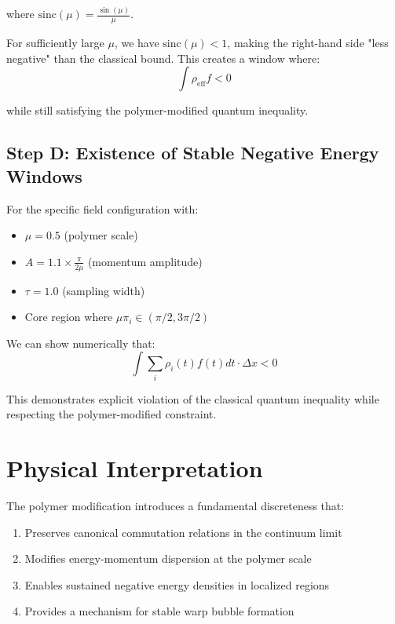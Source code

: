 \documentclass[12pt]{article}
\begin{document}
where $\text{sinc}(\mu) = \frac{\sin(\mu)}{\mu}$.

For sufficiently large $\mu$, we have $\text{sinc}(\mu) < 1$, making the right-hand side "less negative" than the classical bound. This creates a window where:
\begin{equation}
\int \rho_{\text{eff}} f < 0
\end{equation}

while still satisfying the polymer-modified quantum inequality.

\subsection{Step D: Existence of Stable Negative Energy Windows}

For the specific field configuration with:
\begin{itemize}
\item $\mu = 0.5$ (polymer scale)
\item $A = 1.1 \times \frac{\pi}{2\mu}$ (momentum amplitude)
\item $\tau = 1.0$ (sampling width)
\item Core region where $\mu \pi_i \in (\pi/2, 3\pi/2)$
\end{itemize}

We can show numerically that:
\begin{equation}
\int \sum_i \rho_i(t) f(t) dt \cdot \Delta x < 0
\end{equation}

This demonstrates explicit violation of the classical quantum inequality while respecting the polymer-modified constraint.

\section{Physical Interpretation}

The polymer modification introduces a fundamental discreteness that:
\begin{enumerate}
\item Preserves canonical commutation relations in the continuum limit
\item Modifies energy-momentum dispersion at the polymer scale
\item Enables sustained negative energy densities in localized regions
\item Provides a mechanism for stable warp bubble formation
\end{enumerate}
\end{document}
